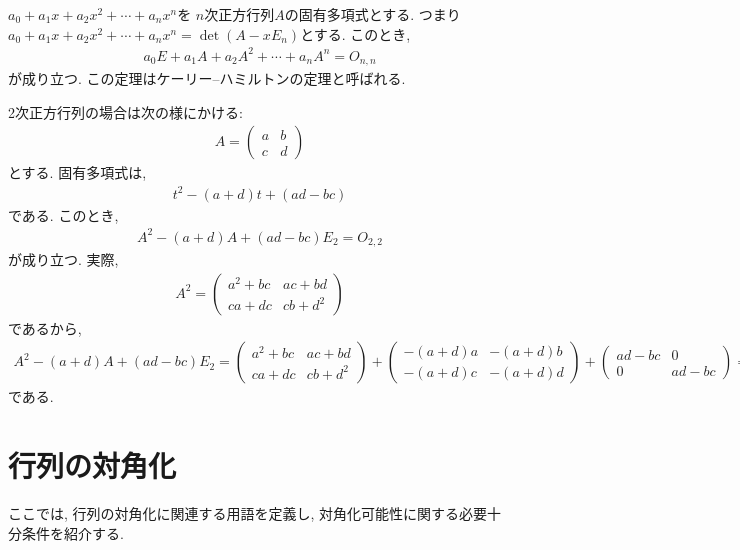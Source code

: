 \begin{remark}
  \label{thm:cht:general}
  $a_0+a_1x+a_2x^2+\cdots+a_nx^n$を
  $n$次正方行列$A$の固有多項式とする.
  つまり $a_0+a_1x+a_2x^2+\cdots+a_nx^n=\det(A-xE_n)$とする.
  このとき,
  \begin{align*}
    a_0E+a_1A+a_2A^2+\cdots+a_nA^n=O_{n,n}
  \end{align*}
  が成り立つ.
  この定理はケーリー--ハミルトンの定理と呼ばれる.
\end{remark}
\begin{remark}
    2次正方行列の場合は次の様にかける:
  \label{thm:cht:2dim}
  \begin{align*}
    A=
    \begin{pmatrix}
      a&b\\c&d
    \end{pmatrix}
  \end{align*}
  とする.
  固有多項式は,
  \begin{align*}
    t^2-(a+d)t+(ad-bc)
  \end{align*}
  である. このとき,
  \begin{align*}
    A^2-(a+d)A+(ad-bc)E_2=O_{2,2}
  \end{align*}
  が成り立つ.
  実際,
  \begin{align*}
    A^2=\begin{pmatrix}a^2+bc&ac+bd\\ca+dc&cb+d^2\end{pmatrix}
  \end{align*}
  であるから,
  \begin{align*}
    A^2-(a+d)A+(ad-bc)E_2=\begin{pmatrix}a^2+bc&ac+bd\\ca+dc&cb+d^2\end{pmatrix}+\begin{pmatrix}-(a+d)a&-(a+d)b\\-(a+d)c&-(a+d)d\end{pmatrix}
    +\begin{pmatrix}ad-bc&0\\0&ad-bc\end{pmatrix}=O_{2,2}
  \end{align*}
である.  
\end{remark}

\section{行列の対角化}
ここでは,
行列の対角化に関連する用語を定義し,
対角化可能性に関する必要十分条件を紹介する.

